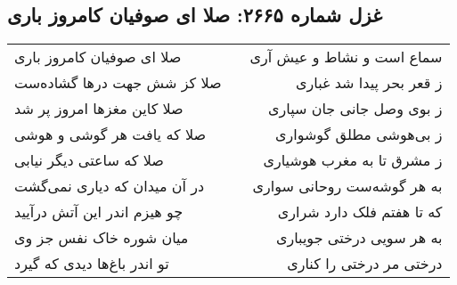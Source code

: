 \begin{center}
\section*{غزل شماره ۲۶۶۵: صلا ای صوفیان کامروز باری}
\label{sec:2665}
\begin{longtable}{l p{0.5cm} r}
صلا ای صوفیان کامروز باری
&&
سماع است و نشاط و عیش آری
\\
صلا کز شش جهت درها گشاده‌ست
&&
ز قعر بحر پیدا شد غباری
\\
صلا کاین مغزها امروز پر شد
&&
ز بوی وصل جانی جان سپاری
\\
صلا که یافت هر گوشی و هوشی
&&
ز بی‌هوشی مطلق گوشواری
\\
صلا که ساعتی دیگر نیابی
&&
ز مشرق تا به مغرب هوشیاری
\\
در آن میدان که دیاری نمی‌گشت
&&
به هر گوشه‌ست روحانی سواری
\\
چو هیزم اندر این آتش درآیید
&&
که تا هفتم فلک دارد شراری
\\
میان شوره خاک نفس جز وی
&&
به هر سویی درختی جویباری
\\
تو اندر باغ‌ها دیدی که گیرد
&&
درختی مر درختی را کناری
\\
\end{longtable}
\end{center}
